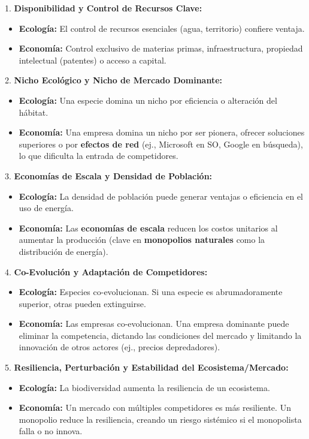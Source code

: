 \documentclass{article}
\begin{document}
1.  \textbf{Disponibilidad y Control de Recursos Clave:}
    \begin{itemize}
        \item \textbf{Ecología:} El control de recursos esenciales (agua, territorio) confiere ventaja.
        \item \textbf{Economía:} Control exclusivo de materias primas, infraestructura, propiedad intelectual (patentes) o acceso a capital.
    \end{itemize}
2.  \textbf{Nicho Ecológico y Nicho de Mercado Dominante:}
    \begin{itemize}
        \item \textbf{Ecología:} Una especie domina un nicho por eficiencia o alteración del hábitat.
        \item \textbf{Economía:} Una empresa domina un nicho por ser pionera, ofrecer soluciones superiores o por \textbf{efectos de red} (ej., Microsoft en SO, Google en búsqueda), lo que dificulta la entrada de competidores.
    \end{itemize}
3.  \textbf{Economías de Escala y Densidad de Población:}
    \begin{itemize}
        \item \textbf{Ecología:} La densidad de población puede generar ventajas o eficiencia en el uso de energía.
        \item \textbf{Economía:} Las \textbf{economías de escala} reducen los costos unitarios al aumentar la producción (clave en \textbf{monopolios naturales} como la distribución de energía).
    \end{itemize}
4.  \textbf{Co-Evolución y Adaptación de Competidores:}
    \begin{itemize}
        \item \textbf{Ecología:} Especies co-evolucionan. Si una especie es abrumadoramente superior, otras pueden extinguirse.
        \item \textbf{Economía:} Las empresas co-evolucionan. Una empresa dominante puede eliminar la competencia, dictando las condiciones del mercado y limitando la innovación de otros actores (ej., precios depredadores).
    \end{itemize}
5.  \textbf{Resiliencia, Perturbación y Estabilidad del Ecosistema/Mercado:}
    \begin{itemize}
        \item \textbf{Ecología:} La biodiversidad aumenta la resiliencia de un ecosistema.
        \item \textbf{Economía:} Un mercado con múltiples competidores es más resiliente. Un monopolio reduce la resiliencia, creando un riesgo sistémico si el monopolista falla o no innova.
    \end{itemize}
\end{document}
